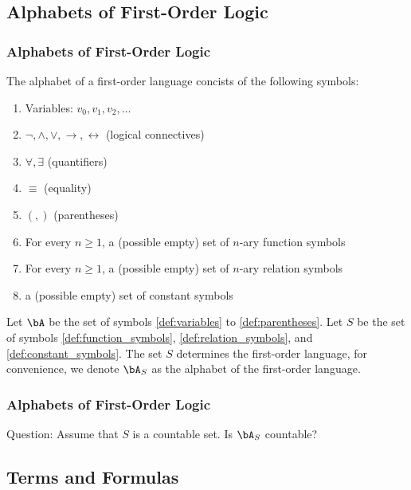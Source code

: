 \subsection{Alphabets of First-Order Logic}

\begin{frame}
    \frametitle{Alphabets of First-Order Logic}
    
    \begin{definition}
        The alphabet of a first-order language concists of the following symbols:
        \begin{enumerate}
            \item Variables: $v_0, v_1, v_2, \ldots$ \label{def:variables}
            \item $\neg, \wedge, \vee, \rightarrow, \leftrightarrow$ (logical connectives) \label{def:logical_connectives}
            \item $\forall, \exists$ (quantifiers) \label{def:quantifiers}
            \item $\equiv$ (equality) \label{def:equality}
            \item $(, )$ (parentheses) \label{def:parentheses}
            \item For every $n \geq 1$, a (possible empty) set of $n$-ary function symbols \label{def:function_symbols}
            \item For every $n \geq 1$, a (possible empty) set of $n$-ary relation symbols \label{def:relation_symbols}
            \item a (possible empty) set of constant symbols \label{def:constant_symbols}
        \end{enumerate}
    \end{definition}
    Let $\bA$ be the set of symbols \ref{def:variables} to \ref{def:parentheses}.
    Let $S$ be the set of symbols \ref{def:function_symbols}, \ref{def:relation_symbols}, and \ref{def:constant_symbols}. 
    The set $S$ determines the first-order language, for convenience, we denote $\bA_S$ as the alphabet of the first-order language.
\end{frame}

\begin{frame}
    \frametitle{Alphabets of First-Order Logic}

    Question:
    Assume that $S$ is a countable set. Is $\bA_S$ countable?

\end{frame}

\subsection{Terms and Formulas}

